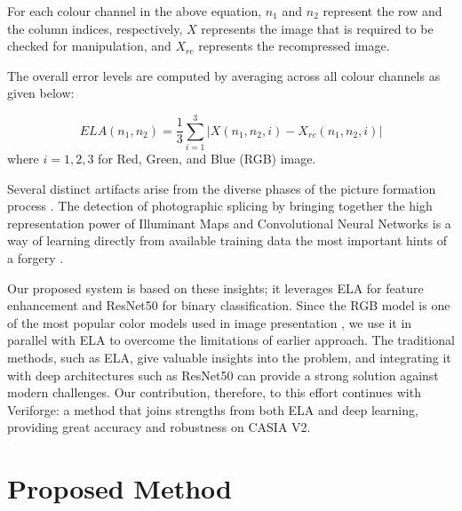 \documentclass{ieeeaccess}
\begin{document}
For each colour channel in the above equation, \( n_1 \) and \( n_2 \) represent the row and the column indices, respectively, \( X \) represents the image that is required to be checked for manipulation, and \( X_{rc} \) represents the recompressed image.

The overall error levels are computed by averaging across all colour channels as given below:

\begin{equation}
	ELA(n_1, n_2) = \frac{1}{3} \sum_{i=1}^{3} \left| X(n_1, n_2, i) - X_{rc}(n_1, n_2, i) \right|  \tag{5}
\end{equation}
where \( i = 1, 2, 3 \) for Red, Green, and Blue (RGB) image.

Several distinct artifacts arise from the diverse phases of the picture formation process \cite{10688184}. The detection of photographic splicing by bringing together the high representation power of Illuminant Maps and Convolutional Neural Networks is a way of learning directly from available training data the most important hints of a forgery \cite{8451227}.

Our proposed system is based on these insights; it leverages ELA for feature enhancement and ResNet50 for binary classification. Since the RGB model is one of the most popular color models used in image presentation \cite{10296670}, we use it in parallel with ELA to overcome the limitations of earlier approach. The traditional methods, such as ELA, give valuable insights into the problem, and integrating it with deep architectures such as ResNet50 can provide a strong solution against modern challenges. Our contribution, therefore, to this effort continues with Veriforge: a method that joins strengths from both ELA and deep learning, providing great accuracy and robustness on CASIA V2.


\section{Proposed Method}
\end{document}
